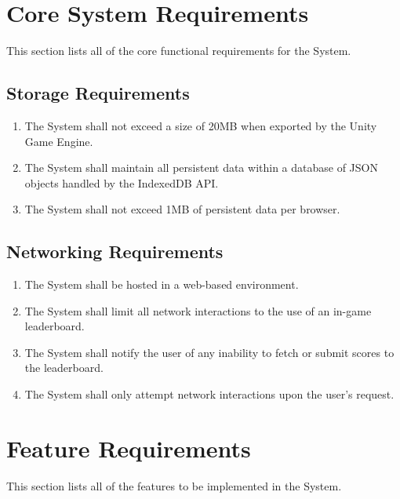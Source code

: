 \documentclass[12pt]{report}
\newenvironment{reqlist}{
	\renewcommand{\labelenumi}{\tab\thesubsection.\arabic{enumi}}
	\renewcommand{\labelenumii}{\thesubsection.\arabic{enumi}.\arabic{enumii}}
	\begin{enumerate}[itemsep = 1pt, parsep = 0pt, leftmargin = *]
}{\end{enumerate}}
\begin{document}
\section{Core System Requirements}
	This section lists all of the core functional requirements for the System.
	\subsection{Storage Requirements}
		\begin{reqlist}
			\item The System shall not exceed a size of 20MB when exported by the Unity Game Engine.
			\item The System shall maintain all persistent data within a database of JSON objects handled by the IndexedDB API.
			\item The System shall not exceed 1MB of persistent data per browser.
		\end{reqlist}
	\subsection{Networking Requirements}
		\begin{reqlist}
			\item The System shall be hosted in a web-based environment.
			\item The System shall limit all network interactions to the use of an in-game leaderboard.
			\item The System shall notify the user of any inability to fetch or submit scores to the leaderboard.
			\item The System shall only attempt network interactions upon the user's request.
		\end{reqlist}
		
\section{Feature Requirements}
	This section lists all of the features to be implemented in the System.
\end{document}
